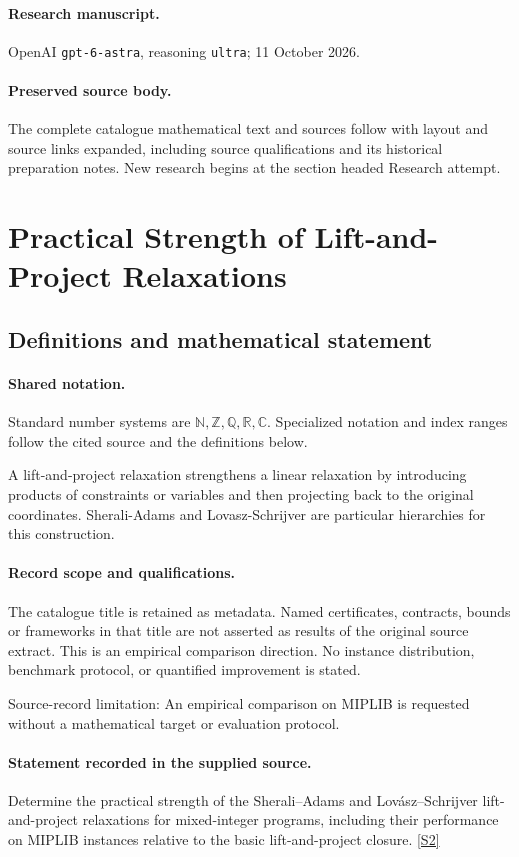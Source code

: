 \documentclass[11pt]{article}
\begin{document}
\paragraph{Research manuscript.} OpenAI \texttt{gpt-6-astra}, reasoning \texttt{ultra}; 11 October 2026.
\paragraph{Preserved source body.} The complete catalogue mathematical text and sources follow with layout and source links expanded, including source qualifications and its historical preparation notes. New research begins at the section headed Research attempt.

\section{Practical Strength of Lift-and-Project Relaxations}\label{statement}

\subsection{Definitions and mathematical statement}

\paragraph{Shared notation.}Standard number systems are $\mathbb N,\mathbb Z,\mathbb Q,\mathbb R,\mathbb C$. Specialized notation and index ranges follow the cited source and the definitions below.


A lift-and-project relaxation strengthens a linear relaxation by introducing products of constraints or variables and then projecting back to the original coordinates. Sherali-Adams and Lovasz-Schrijver are particular hierarchies for this construction.
\paragraph{Record scope and qualifications.}
The catalogue title is retained as metadata. Named certificates, contracts, bounds or frameworks in that title are not asserted as results of the original source extract.
This is an empirical comparison direction. No instance distribution, benchmark protocol, or quantified improvement is stated.

Source-record limitation: An empirical comparison on MIPLIB is requested without a mathematical target or evaluation protocol.
\paragraph{Statement recorded in the supplied source.}
Determine the practical strength of the Sherali–Adams and Lovász–Schrijver lift-and-project relaxations for mixed-integer programs, including their performance on MIPLIB instances relative to the basic lift-and-project closure. \href{https://doi.org/10.4171/owr/2005/50}{[S2]}
\end{document}
